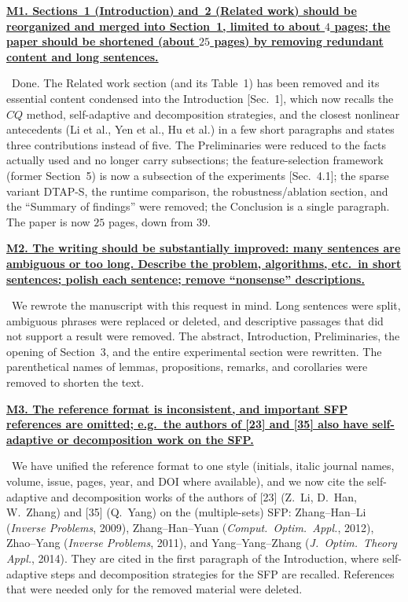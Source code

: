 \documentclass[11pt]{article}
\newcommand{\response}[1]{\smallskip\noindent{\color{blue!60!black}\textbf{Response.}}\ #1\par\medskip}
\newcommand{\loc}[1]{\textcolor{blue!50!black}{[#1]}}
\newenvironment{point}[1]{\medskip\noindent\textbf{\uline{#1}}\par}{\par}
\begin{document}
\begin{point}{M1. Sections~1 (Introduction) and~2 (Related work) should be reorganized and
merged into Section~1, limited to about $4$ pages; the paper should be shortened (about
$25$ pages) by removing redundant content and long sentences.}
\response{Done. The Related work section (and its Table~1) has been removed and its
essential content condensed into the Introduction \loc{Sec.~1}, which now recalls the
$CQ$ method, self-adaptive and decomposition strategies, and the closest nonlinear
antecedents (Li et al., Yen et al., Hu et al.) in a few short paragraphs and states three
contributions instead of five. The Preliminaries were reduced to the facts actually used
and no longer carry subsections; the feature-selection framework (former Section~5) is now
a subsection of the experiments \loc{Sec.~4.1}; the sparse variant DTAP-S, the runtime
comparison, the robustness/ablation section, and the ``Summary of findings'' were removed;
the Conclusion is a single paragraph. The paper is now $25$ pages, down from $39$.}
\end{point}

\begin{point}{M2. The writing should be substantially improved: many sentences are
ambiguous or too long. Describe the problem, algorithms, etc.\ in short sentences; polish
each sentence; remove ``nonsense'' descriptions.}
\response{We rewrote the manuscript with this request in mind. Long sentences were split,
ambiguous phrases were replaced or deleted, and descriptive passages that did not support
a result were removed. The abstract, Introduction, Preliminaries, the opening of Section~3,
and the entire experimental section were rewritten. The parenthetical names of lemmas,
propositions, remarks, and corollaries were removed to shorten the text.}
\end{point}

\begin{point}{M3. The reference format is inconsistent, and important SFP references are
omitted; e.g.\ the authors of [23] and [35] also have self-adaptive or decomposition work
on the SFP.}
\response{We have unified the reference format to one style (initials, italic journal
names, volume, issue, pages, year, and DOI where available), and we now cite the
self-adaptive and decomposition works of the authors of [23] (Z.~Li, D.~Han, W.~Zhang) and
[35] (Q.~Yang) on the (multiple-sets) SFP: Zhang--Han--Li (\emph{Inverse Problems}, 2009),
Zhang--Han--Yuan (\emph{Comput.\ Optim.\ Appl.}, 2012), Zhao--Yang (\emph{Inverse
Problems}, 2011), and Yang--Yang--Zhang (\emph{J.\ Optim.\ Theory Appl.}, 2014). They are
cited in the first paragraph of the Introduction, where self-adaptive steps and
decomposition strategies for the SFP are recalled. References that were needed only for the
removed material were deleted.}
\end{point}
\end{document}
